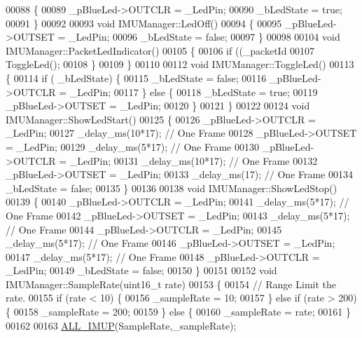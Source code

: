 \begin{DoxyCode}
00088 \{
00089     \_pBlueLed->OUTCLR   = \_LedPin;
00090     \_bLedState          = \textcolor{keyword}{true};
00091 \}
00092 
00093 \textcolor{keywordtype}{void} IMUManager::LedOff()
00094 \{
00095     \_pBlueLed->OUTSET   = \_LedPin;
00096     \_bLedState          = \textcolor{keyword}{false};
00097 \}
00098 
00104 \textcolor{keywordtype}{void} IMUManager::PacketLedIndicator()
00105 \{
00106     \textcolor{keywordflow}{if} ((\_packetId %
00107         ToggleLed();
00108     \}
00109 \}
00110 
00112 \textcolor{keywordtype}{void} IMUManager::ToggleLed()
00113 \{
00114     \textcolor{keywordflow}{if} ( \_bLedState) \{
00115         \_bLedState = \textcolor{keyword}{false};
00116         \_pBlueLed->OUTCLR = \_LedPin;
00117     \} \textcolor{keywordflow}{else} \{
00118         \_bLedState = \textcolor{keyword}{true};
00119         \_pBlueLed->OUTSET = \_LedPin;
00120     \}
00121 \}
00122 
00124 \textcolor{keywordtype}{void} IMUManager::ShowLedStart()
00125 \{
00126     \_pBlueLed->OUTCLR = \_LedPin;
00127     \_delay\_ms(10*17); \textcolor{comment}{// One Frame}
00128     \_pBlueLed->OUTSET = \_LedPin;
00129     \_delay\_ms(5*17); \textcolor{comment}{// One Frame}
00130     \_pBlueLed->OUTCLR = \_LedPin;
00131     \_delay\_ms(10*17); \textcolor{comment}{// One Frame}
00132     \_pBlueLed->OUTSET = \_LedPin;
00133     \_delay\_ms(17); \textcolor{comment}{// One Frame}
00134     \_bLedState        = \textcolor{keyword}{false};
00135 \}
00136 
00138 \textcolor{keywordtype}{void} IMUManager::ShowLedStop()
00139 \{
00140     \_pBlueLed->OUTCLR = \_LedPin;
00141     \_delay\_ms(5*17); \textcolor{comment}{// One Frame}
00142     \_pBlueLed->OUTSET = \_LedPin;
00143     \_delay\_ms(5*17); \textcolor{comment}{// One Frame}
00144     \_pBlueLed->OUTCLR = \_LedPin;
00145     \_delay\_ms(5*17); \textcolor{comment}{// One Frame}
00146     \_pBlueLed->OUTSET = \_LedPin;
00147     \_delay\_ms(5*17); \textcolor{comment}{// One Frame}
00148     \_pBlueLed->OUTCLR = \_LedPin;
00149     \_bLedState        = \textcolor{keyword}{false};
00150 \}
00151 
00152 \textcolor{keywordtype}{void} IMUManager::SampleRate(uint16\_t rate)
00153 \{
00154     \textcolor{comment}{// Range Limit the rate.}
00155     \textcolor{keywordflow}{if} (rate < 10) \{
00156         \_sampleRate = 10;
00157     \} \textcolor{keywordflow}{else} \textcolor{keywordflow}{if} (rate > 200) \{
00158         \_sampleRate = 200;
00159     \} \textcolor{keywordflow}{else} \{
00160         \_sampleRate = rate;
00161     \}
00162 
00163     \hyperlink{_i_m_u_manager_8cpp_a3264743b07dd4d954bcd87d271d09fd6}{ALL_IMUP}(SampleRate,\_sampleRate);

\end{DoxyCode}
